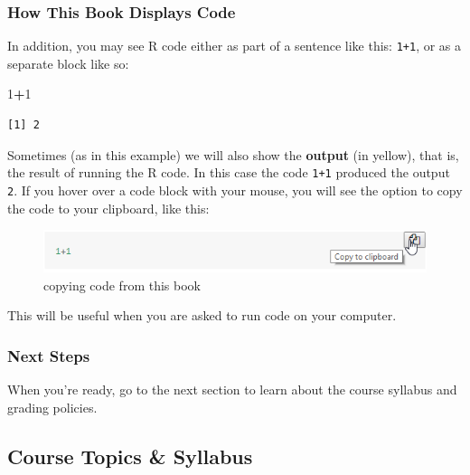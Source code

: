 \documentclass[
]{article}
\newenvironment{Shaded}{\begin{snugshade}}{\end{snugshade}}
\newcommand{\DecValTok}[1]{\textcolor[rgb]{0.00,0.00,0.81}{#1}}
\newcommand{\OperatorTok}[1]{\textcolor[rgb]{0.81,0.36,0.00}{\textbf{#1}}}
\begin{document}
\hypertarget{how-this-book-displays-code}{%
\subsubsection{How This Book Displays Code}\label{how-this-book-displays-code}}

In addition, you may see R code either as part of a sentence like this: \texttt{1+1}, or as a separate block like so:

\begin{Shaded}
\begin{Highlighting}[]
\DecValTok{1}\OperatorTok{+}\DecValTok{1}
\end{Highlighting}
\end{Shaded}

\begin{verbatim}
[1] 2
\end{verbatim}

Sometimes (as in this example) we will also show the \textbf{output} (in yellow), that is, the result of running the R code. In this case the code \texttt{1+1} produced the output \texttt{2}.
If you hover over a code block with your mouse, you will see the option to copy the code to your clipboard, like this:

\begin{figure}

{\centering \includegraphics{src/images/copy_code} 

}

\caption{copying code from this book}\label{fig:unnamed-chunk-9}
\end{figure}

This will be useful when you are asked to run code on your computer.

\hypertarget{next-steps}{%
\subsubsection{Next Steps}\label{next-steps}}

When you're ready, go to the next section to learn about the course syllabus and grading policies.

\hypertarget{course-topics-syllabus}{%
\subsection{Course Topics \& Syllabus}\label{course-topics-syllabus}}
\end{document}
